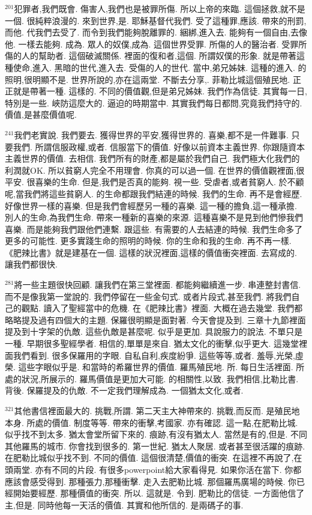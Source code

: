 \documentclass{book}
\begin{document}
$^{201}$犯罪者,我們既會.
傷害人,我們也是被罪所傷.
所以上帝的來臨.
這個拯救,就不是一個.
很純粹浪漫的.
來到世界,是.
耶穌基督代我們.
受了這種罪,應該.
帶來的刑罰,而他.
代我們去受了.
而令到我們能夠脫離罪的.
綑綁,進入去.
能夠有一個自由,去像他.
一樣去能夠.
成為.
眾人的奴僕,成為.
這個世界受罪.
所傷的人的醫治者.
受罪所傷的人的幫助者.
這個破滅關係.
裡面的復和者,這個.
所謂奴僕的形象.
就是帶著這種使命,進入.
黑暗的世代,進入去.
受傷的人的世代.
當中,弟兄姊妹.
這種的進入.
的照明,很明顯不是.
世界所說的,亦在這兩堂.
不斷去分享,.
菲勒比城這個殖民地.
正正就是帶著一種.
這樣的.
不同的價值觀,但是弟兄姊妹.
我們作為信徒.
其實每一日,特別是一些.
峽防這麼大的.
逼迫的時期當中.
其實我們每日都問,究竟我們持守的.
價值,是甚麼價值呢.

$^{241}$我們老實說.
我們要去.
獲得世界的平安,獲得世界的.
喜樂,都不是一件難事.
只要我們.
所謂信服政權,或者.
信服當下的價值.
好像以前資本主義世界.
你跟隨資本主義世界的價值.
去相信.
我們所有的財產,都是屬於我們自己.
我們極大化我們的利潤就OK.
所以貧窮人完全不用理會.
你真的可以過一個.
在世界的價值觀裡面,很平安.
很喜樂的生命.
但是,我們是否真的能夠.
視一些.
受虐者,或者貧窮人.
於不顧呢,當我們將這些貧窮人.
的生命都跟我們結連的時候.
我們的生命.
再不是會經歷.
好像世界一樣的喜樂.
但是我們會經歷另一種的喜樂.
這一種的擔負,這一種承擔.
別人的生命,為我們生命.
帶來一種新的喜樂的來源.
這種喜樂不是見到他們慘我們喜樂.
而是能夠我們跟他們連繫.
跟這些.
有需要的人去結連的時候.
我們生命多了更多的可能性.
更多實踐生命的照明的時候.
你的生命和我的生命.
再不再一樣.
《肥辣比書》就是建基在一個.
這樣的狀況裡面,這樣的價值衝突裡面.
去寫成的.
讓我們都很快.

$^{281}$將一些主題很快回顧.
讓我們在第三堂裡面.
都能夠繼續進一步.
串連整封書信.
而不是像我第一堂說的.
我們停留在一些金句式.
或者片段式,甚至我們.
將我們自己的觀點.
讀入了聖經當中的危機.
在《肥辣比書》裡面.
大概在過去幾堂.
我們都略略提及過有四個大的主題.
保羅很明顯是面對著.
今天會提及到.
三章十九節裡面提及到十字架的仇敵.
這些仇敵是甚麼呢.
似乎是更加.
具說服力的說法.
不單只是一種.
早期很多聖經學者.
相信的,單單是來自.
猶太文化的衝擊,似乎更大.
這幾堂裡面我們看到.
很多保羅用的字眼.
自私自利,疾度紛爭.
這些等等,或者.
羞辱,光榮,虛榮.
這些字眼似乎是.
和當時的希羅世界的價值.
羅馬殖民地.
所.
每日生活裡面.
所處的狀況,所展示的.
羅馬價值是更加大可能.
的相關性,以致.
我們相信,比勒比書.
背後.
保羅提及的仇敵.
不一定我們理解成為.
一個猶太文化,或者.

$^{321}$其他書信裡面最大的.
挑戰,所謂.
第二天主大神帶來的.
挑戰,而反而.
是殖民地本身.
所處的價值.
制度等等.
帶來的衝擊,考國家.
亦有確認.
這一點,在肥勒比城.
似乎找不到太多.
猶太會堂所留下來的.
痕跡,有沒有猶太人.
當然是有的,但是.
不同其他羅馬的城市.
你會找到很多的.
第一世紀.
猶太人聚居.
或者甚至很活躍的痕跡.
在肥勒比城似乎找不到.
不同的價值.
這個很清楚,價值的衝突.
在這裡不再說了,在頭兩堂.
亦有不同的片段.
有很多powerpoint給大家看得見.
如果你活在當下.
你都應該會感受得到.
那種張力,那種衝擊.
走入去肥勒比城.
那個羅馬廣場的時候.
你已經開始要經歷.
那種價值的衝突.
所以.
這就是.
令到.
肥勒比的信徒.
一方面他信了主,但是.
同時他每一天活的價值.
其實和他所信的.
是兩碼子的事.
\end{document}
